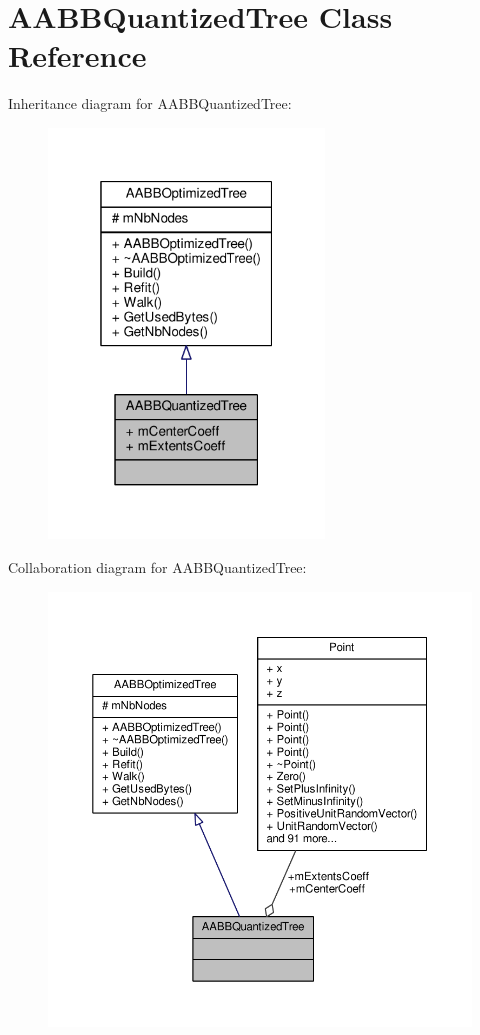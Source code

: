 \hypertarget{classAABBQuantizedTree}{}\section{A\+A\+B\+B\+Quantized\+Tree Class Reference}
\label{classAABBQuantizedTree}


Inheritance diagram for A\+A\+B\+B\+Quantized\+Tree\+:
\nopagebreak
\begin{figure}[H]
\begin{center}
\leavevmode
\includegraphics[width=208pt]{df/d6d/classAABBQuantizedTree__inherit__graph}
\end{center}
\end{figure}


Collaboration diagram for A\+A\+B\+B\+Quantized\+Tree\+:
\nopagebreak
\begin{figure}[H]
\begin{center}
\leavevmode
\includegraphics[width=350pt]{d4/d04/classAABBQuantizedTree__coll__graph}
\end{center}
\end{figure}
